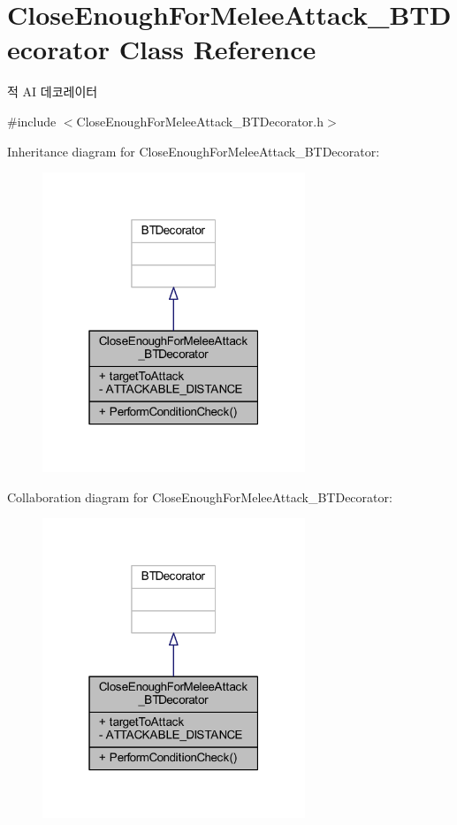\hypertarget{class_close_enough_for_melee_attack___b_t_decorator}{}\section{Close\+Enough\+For\+Melee\+Attack\+\_\+\+B\+T\+Decorator Class Reference}
\label{class_close_enough_for_melee_attack___b_t_decorator}


적 AI 데코레이터  




{\ttfamily \#include $<$Close\+Enough\+For\+Melee\+Attack\+\_\+\+B\+T\+Decorator.\+h$>$}



Inheritance diagram for Close\+Enough\+For\+Melee\+Attack\+\_\+\+B\+T\+Decorator\+:\nopagebreak
\begin{figure}[H]
\begin{center}
\leavevmode
\includegraphics[width=223pt]{class_close_enough_for_melee_attack___b_t_decorator__inherit__graph}
\end{center}
\end{figure}


Collaboration diagram for Close\+Enough\+For\+Melee\+Attack\+\_\+\+B\+T\+Decorator\+:\nopagebreak
\begin{figure}[H]
\begin{center}
\leavevmode
\includegraphics[width=223pt]{class_close_enough_for_melee_attack___b_t_decorator__coll__graph}
\end{center}
\end{figure}
